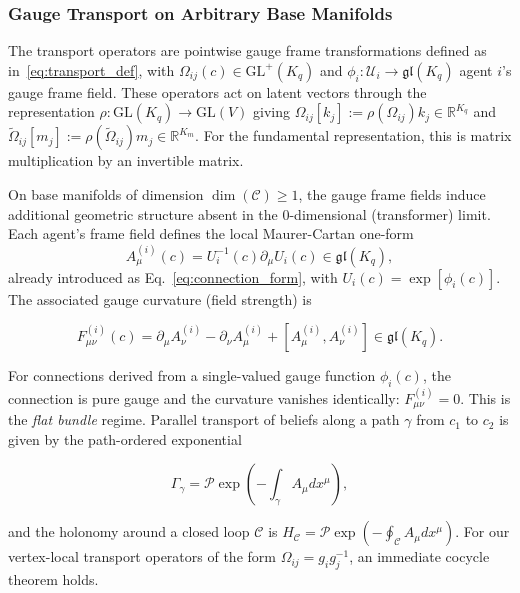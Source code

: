 \documentclass[11pt]{article}
\begin{document}
\subsubsection{Gauge Transport on Arbitrary Base Manifolds}
\label{sec:gauge_transport_arbitrary}

The transport operators are pointwise gauge frame transformations defined as in~\eqref{eq:transport_def}, with $\Omega_{ij}(c) \in \mathrm{GL}^+(K_q)$ and $\phi_i: \mathcal{U}_i \to \mathfrak{gl}(K_q)$ agent $i$'s gauge frame field. These operators act on latent vectors through the representation $\rho: \mathrm{GL}(K_q) \to \mathrm{GL}(V)$ giving $\Omega_{ij}[k_j] := \rho(\Omega_{ij})  k_j \in \mathbb{R}^{K_q}$ and $\tilde{\Omega}_{ij}[m_j] := \rho(\tilde{\Omega}_{ij})  m_j \in \mathbb{R}^{K_m}$. For the fundamental representation, this is matrix multiplication by an invertible matrix.

On base manifolds of dimension $\dim(\mathcal{C}) \geq 1$, the gauge frame fields induce additional geometric structure absent in the 0-dimensional (transformer) limit. Each agent's frame field defines the local Maurer-Cartan one-form
\begin{equation}
A_\mu^{(i)}(c) = U_i^{-1}(c)  \partial_\mu U_i(c) \in \mathfrak{gl}(K_q),
\end{equation}
already introduced as Eq.~\eqref{eq:connection_form}, with $U_i(c) = \exp[\phi_i(c)]$. The associated gauge curvature (field strength) is

\begin{equation}
F_{\mu\nu}^{(i)}(c) = \partial_\mu A_\nu^{(i)} - \partial_\nu A_\mu^{(i)} + [A_\mu^{(i)}, A_\nu^{(i)}] \in \mathfrak{gl}(K_q).
\label{eq:field_strength}
\end{equation}

For connections derived from a single-valued gauge function $\phi_i(c)$, the connection is pure gauge and the curvature vanishes identically: $F_{\mu\nu}^{(i)} = 0$. This is the \emph{flat bundle} regime. Parallel transport of beliefs along a path $\gamma$ from $c_1$ to $c_2$ is given by the path-ordered exponential

\begin{equation}
\Gamma_\gamma = \mathcal{P}\exp\left(-\int_\gamma A_\mu  dx^\mu\right),
\label{eq:parallel_transport}
\end{equation}

and the holonomy around a closed loop $\mathcal{C}$ is $H_{\mathcal{C}} = \mathcal{P}\exp(-\oint_{\mathcal{C}} A_\mu  dx^\mu)$. For our vertex-local transport operators of the form $\Omega_{ij} = g_i g_j^{-1}$, an immediate cocycle theorem holds.
\end{document}

